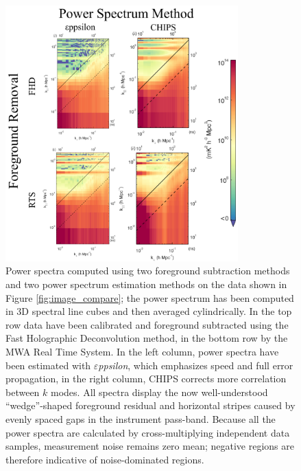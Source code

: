 \documentclass[twolcolumn]{emulateapj}
\def\eppsilon{{\it $\varepsilon$ppsilon}}
\begin{document}
\begin{figure}[htbp]
\begin{center}
\includegraphics[width=0.8\textwidth]{MWA_PS_compare.png}
\caption{Power spectra computed using two foreground subtraction methods and two power spectrum estimation methods on the data shown in Figure \ref{fig:image_compare}; the power spectrum has been computed in 3D spectral line cubes and then averaged cylindrically.  In the top row data have been calibrated and foreground subtracted using the Fast Holographic Deconvolution method, in the bottom row by the MWA Real Time System.  In the left column, power spectra have been estimated with \eppsilon{}, which emphasizes speed and full error propagation, in the right column, CHIPS corrects more correlation between $k$ modes.  All spectra display the now well-understood ``wedge''-shaped foreground residual and horizontal stripes caused by evenly spaced gaps in the instrument pass-band. Because all the power spectra are calculated by cross-multiplying independent data samples, measurement noise remains zero mean; negative regions are therefore indicative of noise-dominated regions.   \label{fig:pspec_compare}}
\end{center}
\end{figure}
\end{document}
